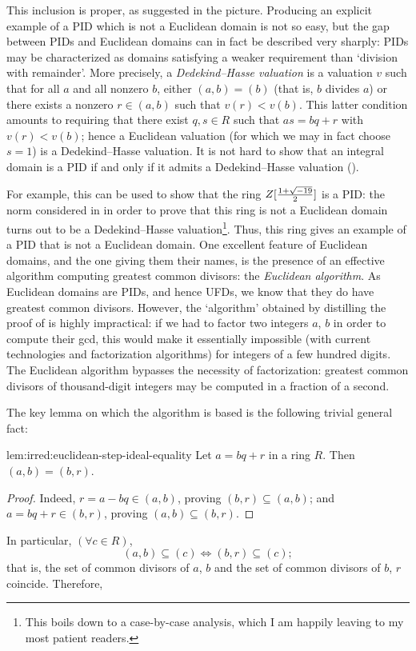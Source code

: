 This inclusion is proper, as suggested in the picture. Producing an
explicit example of a PID which is not a Euclidean domain is not so
easy, but the gap between PIDs and Euclidean domains can in fact be
described very sharply: PIDs may be characterized as domains
satisfying a weaker requirement than `division with remainder'. More
precisely, a \emph{Dedekind--Hasse valuation} is a valuation $v$ such
that for all $a$ and all nonzero $b$, either $(a,b) = (b)$ (that is,
$b$ divides $a$) or there exists a nonzero $r \in (a,b)$ such that
$v(r) < v(b)$. This latter
condition amounts to requiring that there exist $q, s \in R$ such that
$as = bq + r$ with $v(r) < v(b)$; hence a Euclidean valuation (for
which we may in fact choose $s = 1$) is a Dedekind--Hasse
valuation. It is not hard to show that an integral domain is a PID if
and only if it admits a Dedekind--Hasse valuation
().

For example, this can be used to show that the ring
$Z[\frac{1+\sqrt{-19}}{2}]$ is a PID: the norm considered in
 in order to
prove that this ring is not a Euclidean domain turns out to be a
Dedekind--Hasse valuation\footnote{This boils down to a case-by-case
  analysis, which I am happily leaving to my most patient
  readers.}. Thus, this ring gives an example of a PID that is not a
Euclidean domain.  One excellent feature of Euclidean domains, and the
one giving them their names, is the presence of an effective algorithm
computing greatest common divisors: the \emph{Euclidean algorithm}. As
Euclidean domains are PIDs, and hence UFDs, we know that they do have
greatest common divisors.  However, the `algorithm' obtained by
distilling the proof of  is highly impractical: if
we had to factor two integers $a$, $b$ in order to compute their gcd,
this would make it essentially impossible (with current technologies
and factorization algorithms) for integers of a few hundred
digits. The Euclidean algorithm bypasses the necessity of
factorization: greatest common divisors of thousand-digit integers may
be computed in a fraction of a second.

The key lemma on which the algorithm is based is the following trivial
general fact:
\begin{lem}{}{lem:irred:euclidean-step-ideal-equality}
  Let $a = bq + r$ in a ring $R$. Then $(a, b) = (b, r)$.
\end{lem}

\begin{proof}
  Indeed, $r = a - bq \in (a, b)$, proving $(b, r) \subseteq (a, b)$;
  and $a = bq + r \in (b, r)$, proving $(a, b) \subseteq (b, r)$.
\end{proof}
In particular, $(\forall c \in R)$,
\[(a, b) \subseteq (c) \iff (b, r) \subseteq (c);\] that is, the set
of common divisors of $a$, $b$ and the set of common divisors of $b$,
$r$ coincide. Therefore,

